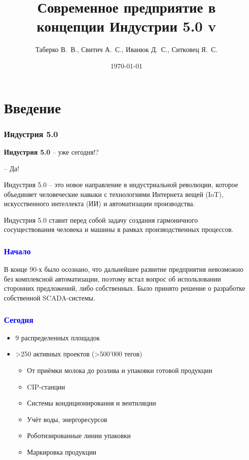 \documentclass{beamer}
\title{
    Современное предприятие в концепции Индустрии 5.0
    \ifdefined\tagversion
        \newline
        \newline
        v\tagversion
    \fi}
\author{Таберко В.~В., Свитич А.~С., Иванюк Д.~С., Ситковец Я.~С.}
\institute{Савушкин продукт}
\date{\today}
\begin{document}
\frame{\titlepage}

\section{Введение}
 {
  \begin{frame}
      \frametitle{Индустрия 5.0}

      {\Large \textbf{Индустрия 5.0}} -- уже сегодня!?

      -- Да!
  \end{frame}
 }
 \begin{frame}
    Индустрия 5.0 -- это новое направление в индустриальной революции, которое объединяет человеческие навыки с технологиями Интернета вещей (IoT), искусственного интеллекта (ИИ) и автоматизации производства.
 \end{frame}

 \begin{frame}
    Индустрия 5.0 ставит перед собой задачу создания гармоничного сосуществования человека и машины в рамках производственных процессов.
 \end{frame}

 \begin{frame}
    \frametitle{\textcolor{blue}{Начало}}

      В конце 90-х было осознано, что дальнейшее развитие предприятия невозможно без комплексной автоматизации, поэтому встал вопрос об использовании сторонних предложений, либо собственных. Было принято решение о разработке собственной SCADA-системы.

 \end{frame}

 \begin{frame}
    \frametitle{\textcolor{blue}{Сегодня}}

    \begin{itemize}
        \color{black}
        \item[\textcolor{teal}{\textbullet}] 9 распределенных площадок
        \item[\textcolor{teal}{\textbullet}] >250 активных проектов (>500’000 тегов)
            \begin{itemize}
                \color{black}
                \item[\textcolor{teal}{\ding{226}}] От приёмки молока до розлива и упаковки готовой продукции
                \item[\textcolor{teal}{\ding{226}}] CIP-станции
                \item[\textcolor{teal}{\ding{226}}] Системы кондиционирования и вентиляции
                \item[\textcolor{teal}{\ding{226}}] Учёт воды, энергоресурсов
                \item[\textcolor{teal}{\ding{226}}] Роботизированные линии упаковки
                \item[\textcolor{teal}{\ding{226}}] Маркировка продукции
            \end{itemize}
    \end{itemize}
\end{frame}
\end{document}
